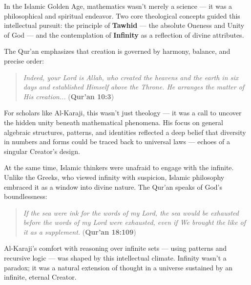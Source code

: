 \begin{tcolorbox}[colback=blue!5!white, colframe=blue!50!black, title={Historical Sidebar: Unity, Infinity, and the Divine Logic of Islamic Mathematics}, breakable]

    In the Islamic Golden Age, mathematics wasn’t merely a science — it was a philosophical and spiritual endeavor. Two core theological concepts guided this intellectual pursuit: the principle of \textbf{Tawhid} — the absolute Oneness and Unity of God — and the contemplation of \textbf{Infinity} as a reflection of divine attributes.

    \medskip
    
    The Qur'an emphasizes that creation is governed by harmony, balance, and precise order:

    \medskip
    
    \begin{quote}
    \textit{Indeed, your Lord is Allah, who created the heavens and the earth in six days and established Himself above the Throne.  He arranges the matter of His creation...}  
    \hfill (\textbf{Qur'an 10:3})
    \end{quote}

    \medskip
    
    For scholars like Al-Karaji, this wasn’t just theology — it was a call to uncover the hidden unity beneath mathematical phenomena. His focus on general algebraic structures, patterns, and identities reflected a deep belief that diversity in numbers and forms could be traced back to universal laws — echoes of a singular Creator’s design.

    \medskip
    
    At the same time, Islamic thinkers were unafraid to engage with the infinite. Unlike the Greeks, who viewed infinity with suspicion, Islamic philosophy embraced it as a window into divine nature. The Qur'an speaks of God’s boundlessness:

    \medskip
    
    \begin{quote}
    \textit{If the sea were ink for the words of my Lord, the sea would be exhausted before the words of my Lord were exhausted, even if We brought the like of it as a supplement.}  
    \hfill (\textbf{Qur'an 18:109})
    \end{quote}
    
    \medskip

    Al-Karaji’s comfort with reasoning over infinite sets — using patterns and recursive logic — was shaped by this intellectual climate. Infinity wasn’t a paradox; it was a natural extension of thought in a universe sustained by an infinite, eternal Creator.


\end{tcolorbox}
